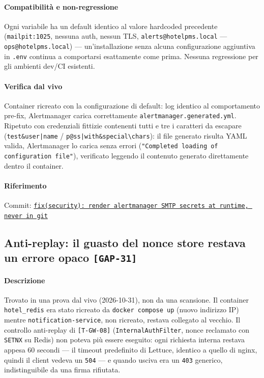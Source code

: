 ﻿\documentclass[a4paper,12pt]{report}
\newcommand{\commitref}[2]{\texttt{\small \href{https://github.com/diegoandruccioli/hotel-pms/commit/#1}{#2}}}
\newcommand{\threat}[1]{\texttt{\small\textcolor{vulnred}{[#1]}}}
\begin{document}
\paragraph{Compatibilità e non-regressione}
Ogni variabile ha un default identico al valore hardcoded precedente
(\texttt{mailpit:1025}, nessuna auth, nessun TLS, \texttt{alerts@hotelpms.local}
--- \texttt{ops@hotelpms.local}) --- un'installazione senza alcuna
configurazione aggiuntiva in \texttt{.env} continua a comportarsi
esattamente come prima. Nessuna regressione per gli ambienti dev/CI
esistenti.

\paragraph{Verifica dal vivo}
Container ricreato con la configurazione di default: log identico al
comportamento pre-fix, Alertmanager carica correttamente
\texttt{alertmanager.generated.yml}. Ripetuto con credenziali fittizie
contenenti tutti e tre i caratteri da escapare
(\texttt{test\&user|name} / \texttt{p@ss|with\&special\textbackslash chars}):
il file generato risulta YAML valida, Alertmanager lo carica senza errori
(\texttt{"Completed loading of configuration file"}), verificato leggendo
il contenuto generato direttamente dentro il container.

\paragraph{Riferimento} Commit: \commitref{ae9121d7}{fix(security): render alertmanager SMTP secrets at runtime, never in git}

\subsection{Anti-replay: il guasto del nonce store restava un errore opaco \threat{GAP-31}}

\paragraph{Descrizione}
Trovato in una prova dal vivo (2026-10-31), non da una scansione. Il container
\texttt{hotel\_redis} era stato ricreato da \texttt{docker compose up} (nuovo
indirizzo IP) mentre \texttt{notification-service}, non ricreato, restava
collegato al vecchio. Il controllo anti-replay di \threat{T-GW-08}
(\texttt{InternalAuthFilter}, nonce reclamato con \texttt{SETNX} su Redis) non
poteva più essere eseguito: ogni richiesta interna restava appesa 60 secondi
--- il timeout predefinito di Lettuce, identico a quello di nginx, quindi il
client vedeva un \texttt{504} --- e quando usciva era un \texttt{403}
generico, indistinguibile da una firma rifiutata.
\end{document}
